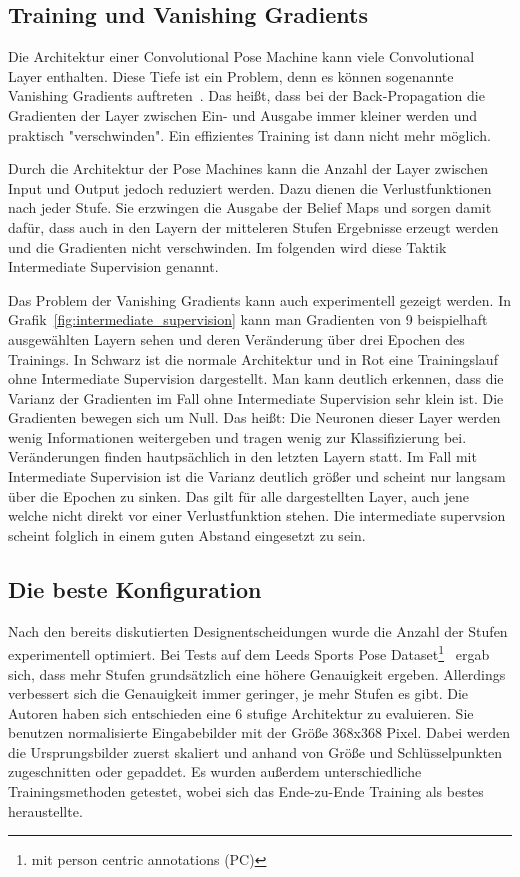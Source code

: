 \documentclass[journal, a4paper]{IEEEtran}
\begin{document}
\subsection{Training und Vanishing Gradients} \label{subsec:vanishing_gradients}

        Die Architektur einer Convolutional Pose Machine kann viele Convolutional Layer enthalten. Diese Tiefe ist ein Problem, denn es können sogenannte Vanishing Gradients auftreten~\cite{vanishing_gradients}. Das heißt, dass bei der Back-Propagation die Gradienten der Layer zwischen Ein- und Ausgabe immer kleiner werden und praktisch "verschwinden". Ein effizientes Training ist dann nicht mehr möglich.

        Durch die Architektur der Pose Machines kann die Anzahl der Layer zwischen Input und Output jedoch reduziert werden. Dazu dienen die Verlustfunktionen nach jeder Stufe. Sie erzwingen die Ausgabe der Belief Maps und sorgen damit dafür, dass auch in den Layern der mitteleren Stufen Ergebnisse erzeugt werden und die Gradienten nicht verschwinden. Im folgenden wird diese Taktik Intermediate Supervision genannt.

        Das Problem der Vanishing Gradients kann auch experimentell gezeigt werden. In Grafik~\ref{fig:intermediate_supervision} kann man Gradienten von 9 beispielhaft ausgewählten Layern sehen und deren Veränderung über drei Epochen des Trainings. In Schwarz ist die normale Architektur und in Rot eine Trainingslauf ohne Intermediate Supervision dargestellt. Man kann deutlich erkennen, dass die Varianz der Gradienten im Fall ohne Intermediate Supervision sehr klein ist. Die Gradienten bewegen sich um Null. Das heißt: Die Neuronen dieser Layer werden wenig Informationen weitergeben und tragen wenig zur Klassifizierung bei. Veränderungen finden hautpsächlich in den letzten Layern statt. Im Fall mit Intermediate Supervision ist die Varianz deutlich größer und scheint nur langsam über die Epochen zu sinken. Das gilt für alle dargestellten Layer, auch jene welche nicht direkt vor einer Verlustfunktion stehen. Die intermediate supervsion scheint folglich in einem guten Abstand eingesetzt zu sein.

\subsection{Die beste Konfiguration}
        
        Nach den bereits diskutierten Designentscheidungen wurde die Anzahl der Stufen experimentell optimiert. Bei Tests auf dem Leeds Sports Pose Dataset\footnote{mit person centric annotations (PC)}~\cite{LSP_dataset} ergab sich, dass mehr Stufen grundsätzlich eine höhere Genauigkeit ergeben. Allerdings verbessert sich die Genauigkeit immer geringer, je mehr Stufen es gibt. Die Autoren haben sich entschieden eine 6 stufige Architektur zu evaluieren. Sie benutzen normalisierte Eingabebilder mit der Größe 368x368 Pixel. Dabei werden die Ursprungsbilder zuerst skaliert und anhand von Größe und Schlüsselpunkten zugeschnitten oder gepaddet. Es wurden außerdem unterschiedliche Trainingsmethoden getestet, wobei sich das Ende-zu-Ende Training als bestes heraustellte.
\end{document}
